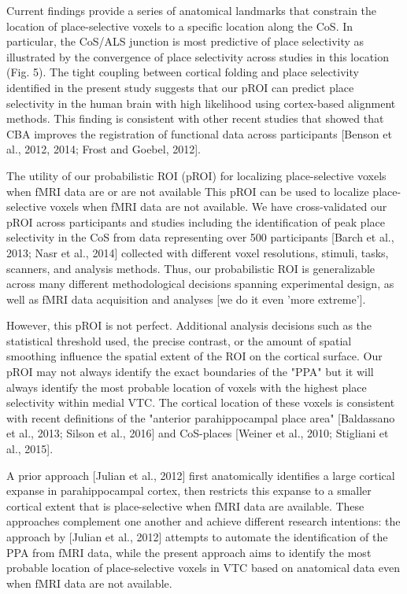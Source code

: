%
Current findings provide a series of anatomical landmarks that constrain the
location of place-selective voxels to a specific location along the CoS.
%
In particular, the CoS/ALS junction is most predictive of place selectivity as
illustrated by the convergence of place selectivity across studies in this
location (Fig. 5).
%
The tight coupling between cortical folding and place selectivity identified in
the present study suggests that our pROI can predict place selectivity in the
human brain with high likelihood using cortex-based alignment methods.
%
This finding is consistent with other recent studies that showed that CBA
improves the registration of functional data across participants [Benson et al.,
2012, 2014; Frost and Goebel, 2012].


The utility of our probabilistic ROI (pROI) for localizing place-selective
voxels when fMRI data are or are not available
%
This pROI can be used to localize place-selective voxels when fMRI data are not
available.
%
We have cross-validated our pROI across participants and studies including the
identification of peak place selectivity in the CoS from data representing over
500 participants [Barch et al., 2013; Nasr et al., 2014] collected with
different voxel resolutions, stimuli, tasks, scanners, and analysis methods.
%
Thus, our probabilistic ROI is generalizable across many different
methodological decisions spanning experimental design, as well as fMRI data
acquisition and analyses [we do it even 'more extreme'].


However, this pROI is not perfect.
%
Additional analysis decisions such as the statistical threshold used, the
precise contrast, or the amount of spatial smoothing influence the spatial
extent of the ROI on the cortical surface.
%
Our pROI may not always identify the exact boundaries of the "PPA" but it will
always identify the most probable location of voxels with the highest place
selectivity within medial VTC.
%
The cortical location of these voxels is consistent with recent definitions of
the "anterior parahippocampal place area" [Baldassano et al., 2013; Silson et
al., 2016] and CoS-places [Weiner et al., 2010; Stigliani et al., 2015].

%
A prior approach [Julian et al., 2012] first anatomically identifies a large
cortical expanse in parahippocampal cortex, then restricts this expanse to a
smaller cortical extent that is place-selective when fMRI data are available.
%
These approaches complement one another and achieve different research
intentions:
%
the approach by [Julian et al., 2012] attempts to automate the identification of
the PPA from fMRI data, while the present approach aims to identify the most
probable location of place-selective voxels in VTC based on anatomical data even
when fMRI data are not available.

